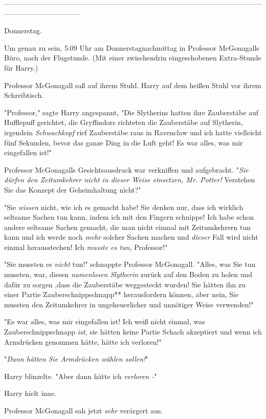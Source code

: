 {--------------------------------------------------------------------------------------------------------------------------------------------

Donnerstag.

Um genau zu sein, 5:09 Uhr am Donnerstagnachmittag in Professor McGonagalls Büro, nach der Flugstunde. (Mit einer zwischendrin eingeschobenen Extra-Stunde für Harry.)

Professor McGonagall saß auf ihrem Stuhl. Harry auf dem heißen Stuhl vor ihrem Schreibtisch.

"Professor," sagte Harry angespannt, "Die Slytherins hatten ihre Zauberstäbe auf Hufflepuff gerichtet, die Gryffindors richteten die Zauberstäbe auf Slytherin, irgendein \emph{Schwachkopf} rief Zauberstäbe raus in Ravenclaw und ich hatte vielleicht fünf Sekunden, bevor das ganze Ding in die Luft geht! Es war alles, was mir eingefallen ist!"

Professor McGonagalls Gesichtsausdruck war verkniffen und aufgebracht. "\emph{Sie dürfen den Zeitumkehrer nicht in dieser Weise einsetzen, Mr. Potter!} Verstehen Sie das Konzept der Geheimhaltung nicht?"

"Sie \emph{wissen} nicht, wie ich es gemacht habe! Sie denken nur, dass ich wirklich seltsame Sachen tun kann, indem ich mit den Fingern schnippe! Ich habe schon andere seltsame Sachen gemacht, die man nicht einmal mit Zeitumkehrern tun kann und ich werde noch \emph{mehr} solcher Sachen machen und \emph{dieser} Fall wird nicht einmal herausstechen! Ich \emph{musste es tun,} Professor!"

"Sie mussten es \emph{nicht} tun!" schnappte Professor McGonagall. "Alles, was Sie tun mussten, war, diesen \emph{namenlosen Slytherin} zurück auf den Boden zu holen und dafür zu sorgen ,dass die Zauberstäbe weggesteckt wurden! Sie hätten ihn zu einer Partie Zauberschnippschnapp** herausfordern können, aber nein, Sie mussten den Zeitumkehrer in ungeheuerlicher und unnötiger Weise verwenden!"

"Es war alles, was mir eingefallen ist! Ich weiß nicht einmal, was Zauberschnippschnapp \emph{ist,} sie hätten keine Partie Schach akzeptiert und wenn ich Armdrücken genommen hätte, hätte ich verloren!"

"\emph{Dann hätten Sie Armdrücken wählen sollen!}"

Harry blinzelte. "Aber dann hätte ich \emph{verloren -}"

Harry hielt inne.

Professor McGonagall sah jetzt \emph{sehr} verärgert aus.

}
